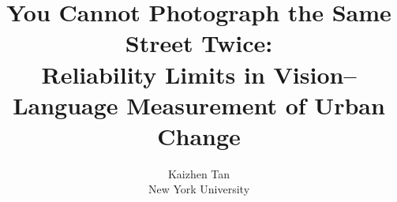\documentclass[11pt]{article}
\begin{document}

\title{You Cannot Photograph the Same Street Twice:\\Reliability Limits in
Vision--Language Measurement of Urban Change}
\author{
  Kaizhen Tan\\[0.12cm]
  \normalsize New York University
}
\date{}
\maketitle








\newpage

\end{document}
